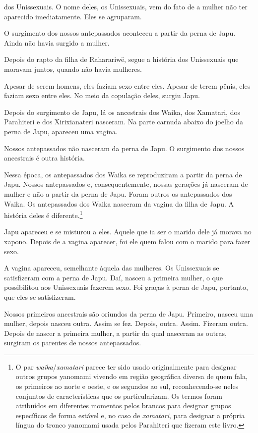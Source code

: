  

 dos Unissexuais. O nome deles, os Unissexuais, vem
do fato de a mulher não ter aparecido imediatamente. Eles se agruparam. 

O surgimento dos nossos antepassados aconteceu a partir da perna de
Japu. Ainda não havia surgido a mulher. 

Depois do rapto da filha de Raharariwë, segue a história dos Unissexuais
que moravam juntos, quando não havia mulheres. 

Apesar de serem homens, eles faziam sexo entre eles. Apesar de terem
pênis, eles faziam sexo entre eles. No meio da copulação
deles, surgiu Japu. 

Depois do surgimento de Japu, lá os ancestrais dos Waika, dos Xamatari,
dos Parahiteri e dos Xirixianateri nasceram. Na parte carnuda abaixo do
joelho da perna de Japu, apareceu uma vagina. 

Nossos antepassados não nasceram da perna de Japu. O surgimento dos
nossos ancestrais é outra história. 

Nessa época, os antepassados dos Waika se reproduziram a partir da
perna de Japu. Nossos antepassados e, consequentemente, nossas gerações
já nasceram de mulher e não a partir da perna de Japu. Foram outros
os antepassados dos Waika. Os antepassados dos Waika nasceram da vagina da
filha de Japu. A história deles é diferente.\footnote{   O par \emph{waika}/\emph{xamatari} parece ter sido usado originalmente para designar outros grupos yanomami vivendo em região geográfica diversa de quem fala, os primeiros ao norte e oeste, e os segundos ao sul, reconhecendo-se neles conjuntos de características que os particularizam. Os termos foram atribuídos em diferentes momentos pelos brancos para designar grupos específicos de forma estável e, no caso de \emph{xamatari}, para designar a própria língua do tronco yanomami usada pelos Parahiteri que fizeram este livro.} 

Japu apareceu e se misturou a eles. Aquele que ia ser o marido
dele já morava no xapono. Depois de a vagina aparecer, foi ele quem
falou com o marido para fazer sexo. 

A vagina apareceu, semelhante àquela das mulheres. Os Unissexuais se
satisfizeram com a perna de Japu. Daí, nasceu a primeira mulher, o que
possibilitou aos Unissexuais fazerem sexo. Foi graças à perna de Japu, portanto,
que eles se satisfizeram. 

Nossos primeiros ancestrais são oriundos da perna de Japu. Primeiro,
nasceu uma mulher, depois nasceu outra. Assim se fez. Depois, outra.
Assim. Fizeram outra. Depois de nascer a primeira mulher, a partir da
qual nasceram as outras, surgiram os parentes de nossos antepassados. 

